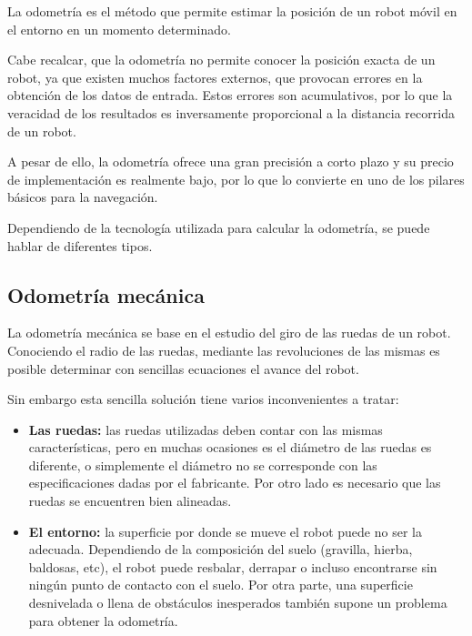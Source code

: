 

La odometría es el método que permite estimar la posición de un robot móvil en
el entorno en un momento determinado. 

Cabe recalcar, que la odometría no permite conocer la posición exacta de un
robot, ya que existen muchos factores externos, que provocan errores en la
obtención de los datos de entrada. Estos errores son acumulativos, por lo que
la veracidad de los resultados es inversamente proporcional a la distancia
recorrida de un robot.

A pesar de ello, la odometría ofrece una gran precisión a corto plazo y su
precio de implementación es realmente bajo, por lo que lo convierte en uno de
los pilares básicos para la navegación. 

Dependiendo de la tecnología utilizada para calcular la odometría, se puede 
hablar de diferentes tipos.

\subsection{Odometría mecánica}
La odometría mecánica se base en el estudio del giro de las ruedas de un robot.
Conociendo el radio de las ruedas, mediante las revoluciones de las mismas es
posible determinar con sencillas ecuaciones el avance del robot.

Sin embargo esta sencilla solución tiene varios inconvenientes a tratar:

\begin{itemize}
  \item \textbf{Las ruedas:} las ruedas utilizadas deben contar con las mismas
  características, pero en muchas ocasiones es el diámetro de las ruedas es
  diferente, o simplemente el diámetro no se corresponde con las
  especificaciones dadas por el fabricante. Por otro lado es necesario que las
  ruedas se encuentren bien alineadas.
  \item \textbf{El entorno:} la superficie por donde se mueve el robot puede no
  ser la adecuada. Dependiendo de la composición del suelo (gravilla, hierba,
  baldosas, etc), el robot puede resbalar, derrapar o incluso encontrarse sin
  ningún punto de contacto con el suelo. Por otra parte, una superficie
  desnivelada o llena de obstáculos inesperados también supone un problema para
  obtener la odometría.
\end{itemize}


